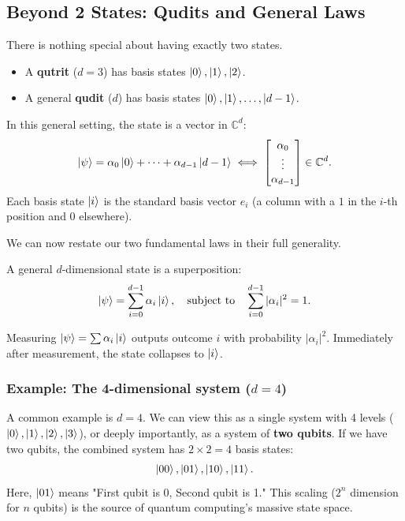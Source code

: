 \subsection{Beyond 2 States: Qudits and General Laws}

There is nothing special about having exactly two states.
\begin{itemize}
    \item A \textbf{qutrit} ($d=3$) has basis states $\ket{0}, \ket{1}, \ket{2}$.
    \item A general \textbf{qudit} ($d$) has basis states $\ket{0}, \ket{1}, \dots, \ket{d-1}$.
\end{itemize}

In this general setting, the state is a vector in $\mathbb{C}^d$:
\[
    \ket{\psi} = \alpha_0\ket{0} + \dots + \alpha_{d-1}\ket{d-1} \iff \begin{bmatrix} \alpha_0 \\ \vdots \\ \alpha_{d-1} \end{bmatrix} \in \mathbb{C}^d.
\]
Each basis state $\ket{i}$ is the standard basis vector $e_i$ (a column with a $1$ in the $i$-th position and $0$ elsewhere).

We can now restate our two fundamental laws in their full generality.

\begin{definition}
A general $d$-dimensional state is a superposition:
\[
    \ket{\psi} = \sum_{i=0}^{d-1} \alpha_i \ket{i}, \quad \text{subject to} \quad \sum_{i=0}^{d-1} |\alpha_i|^2 = 1.
\]
\end{definition}

\begin{definition}
Measuring $\ket{\psi} = \sum \alpha_i \ket{i}$ outputs outcome $i$ with probability $|\alpha_i|^2$.
Immediately after measurement, the state collapses to $\ket{i}$.
\end{definition}

\subsubsection{Example: The 4-dimensional system \texorpdfstring{($d=4$)}{(d=4)}}

A common example is $d=4$. We can view this as a single system with 4 levels ($\ket{0}, \ket{1}, \ket{2}, \ket{3}$), or deeply importantly, as a system of \textbf{two qubits}.
If we have two qubits, the combined system has $2 \times 2 = 4$ basis states:
\[
    \ket{00}, \ket{01}, \ket{10}, \ket{11}.
\]
Here, $\ket{01}$ means "First qubit is 0, Second qubit is 1." This scaling ($2^n$ dimension for $n$ qubits) is the source of quantum computing's massive state space.



% 
% 

% 